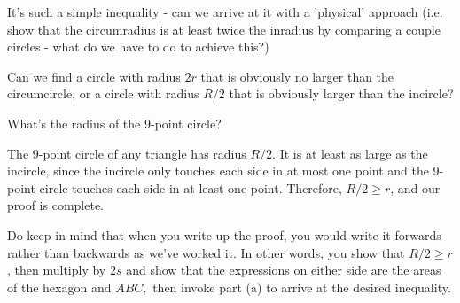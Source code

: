 
It's such a simple inequality - can we arrive at it with a 'physical' approach (i.e. show that the circumradius is at least twice the inradius by comparing a couple circles - what do we have to do to achieve this?)

Can we find a circle with radius $2r$ that is obviously no larger than the circumcircle, or a circle with radius $R/2$ that is obviously larger than the incircle?




What's the radius of the 9-point circle?







The 9-point circle of any triangle has radius $R/2$. It is at least as large as the incircle, since the incircle only touches each side in at most one point and the 9-point circle touches each side in at least one point. Therefore, $R/2 \ge r$, and our proof is complete.

\begin{remark}
    Do keep in mind that when you write up the proof, you would write it forwards rather than backwards as we've worked it. In other words, you show that $R/2 \ge r$, then multiply by $2s$ and show that the expressions on either side are the areas of the hexagon and $ABC,$ then invoke part (a) to arrive at the desired inequality.    
\end{remark}

